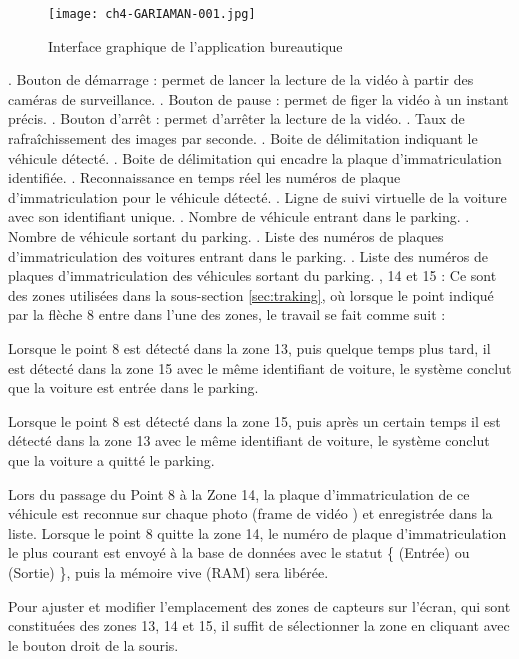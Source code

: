 \begin{figure}[H]
	\centering
	\texttt{[image: ch4-GARIAMAN-001.jpg]}
	\caption{Interface graphique de l'application bureautique }
    \label{fig:final_soft}
\end{figure}
\begin{outline}
. Bouton de démarrage : permet de lancer la lecture de la vidéo à partir des caméras de surveillance.
. Bouton de pause : permet de figer la vidéo à un instant précis.
. Bouton d'arrêt : permet d'arrêter la lecture de la vidéo.
. Taux de rafraîchissement des images par seconde.
. Boite de délimitation indiquant le véhicule détecté.
. Boite de délimitation qui encadre la plaque d'immatriculation identifiée.
. Reconnaissance en temps réel les numéros de plaque d'immatriculation pour le véhicule détecté.
. Ligne de suivi virtuelle de la voiture avec son identifiant unique.
. Nombre de véhicule entrant dans le parking.
. Nombre de véhicule sortant du parking.
. Liste des numéros de plaques d'immatriculation des voitures entrant dans le parking.
. Liste des numéros de plaques d'immatriculation des véhicules sortant du parking.
, 14 et 15 : Ce sont des zones utilisées dans la sous-section \ref{sec:traking}, où lorsque le point indiqué par la flèche 8 entre dans l'une des zones, le travail se fait comme suit :
       
    \2 Lorsque le point 8 est détecté dans la zone 13, puis quelque temps plus tard, il est détecté dans la zone 15 avec le même identifiant de voiture, le système conclut que la voiture est entrée dans le parking.

    \2 Lorsque le point 8 est détecté dans la zone 15, puis après un certain temps il est détecté dans la zone 13 avec le même identifiant de voiture, le système conclut que la voiture a quitté le parking.

    \2 Lors du passage du Point 8 à la Zone 14, la plaque d'immatriculation de ce véhicule est reconnue sur chaque photo (frame de vidéo ) et enregistrée dans la liste. Lorsque le point 8 quitte la zone 14, le numéro de plaque d'immatriculation le plus courant est envoyé à la base de données avec le statut \{ (Entrée) ou (Sortie) \}, puis la mémoire vive (RAM) sera libérée.
    
\1 Pour ajuster et modifier l'emplacement des zones de capteurs sur l'écran, qui sont constituées des zones 13, 14 et 15, il suffit de sélectionner la zone en cliquant avec le bouton droit de la souris.
   
\end{outline}

